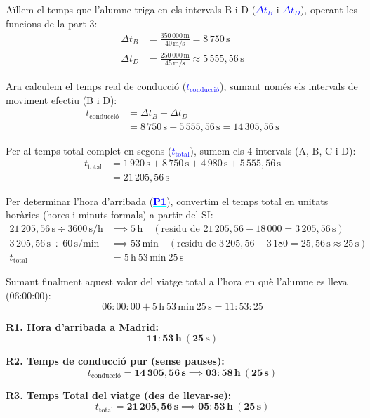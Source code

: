 \documentclass[12pt,a4paper]{article}
\begin{document}
{\color{blue}
Aïllem el temps que l'alumne triga en els intervals B i D (\textcolor{cyan}{\underline{\textcolor{blue}{\textbf{$\Delta t_B$}}}} i \textcolor{cyan}{\underline{\textcolor{blue}{\textbf{$\Delta t_D$}}}}), operant les funcions de la part 3:
\begin{align*}
\Delta t_B &= \frac{350\,000\,\text{m}}{40\,\text{m/s}} = 8\,750\,\text{s} \\[6pt]
\Delta t_D &= \frac{250\,000\,\text{m}}{45\,\text{m/s}} \approx 5\,555{,}56\,\text{s}
\end{align*}

Ara calculem el temps real de conducció (\textcolor{cyan}{\underline{\textcolor{blue}{\textbf{$t_{\text{conducció}}$}}}}), sumant només els intervals de moviment efectiu (B i D):
\begin{align*}
t_{\text{conducció}} &= \Delta t_B + \Delta t_D \\
              &= 8\,750\,\text{s} + 5\,555{,}56\,\text{s} = 14\,305{,}56\,\text{s}
\end{align*}

Per al temps total complet en segons (\textcolor{cyan}{\underline{\textcolor{blue}{\textbf{$t_{\text{total}}$}}}}), sumem els 4 intervals (A, B, C i D):
\begin{align*}
t_{\text{total}} &= 1\,920\,\text{s} + 8\,750\,\text{s} + 4\,980\,\text{s} + 5\,555{,}56\,\text{s} \\
          &= 21\,205{,}56\,\text{s}
\end{align*}

Per determinar l'hora d'arribada (\textcolor{cyan}{\underline{\textcolor{blue}{\textbf{P1}}}}), convertim el temps total en unitats horàries (hores i minuts formals) a partir del SI:
\begin{align*}
21\,205{,}56\,\text{s} \div 3600\,\text{s/h} &\implies 5\,\text{h} \quad (\text{residu de } 21\,205{,}56 - 18\,000 = 3\,205{,}56\,\text{s}) \\
3\,205{,}56\,\text{s} \div 60\,\text{s/min}    &\implies 53\,\text{min} \quad (\text{residu de } 3\,205{,}56 - 3\,180 = 25{,}56\,\text{s} \approx 25\,\text{s}) \\
t_{\text{total}} &= 5\,\text{h}\ 53\,\text{min}\ 25\,\text{s}
\end{align*}

Sumant finalment aquest valor del viatge total a l'hora en què l'alumne es lleva (06:00:00):
\[ 06{:}00{:}00 + 5\,\text{h}\ 53\,\text{min}\ 25\,\text{s} = 11{:}53{:}25 \]

\begin{tcolorbox}[title=Respostes Finals (SI i format horari),colframe=red!70!black,colback=red!5,sharp corners=south,fontupper=\color{blue}]
\textbf{R1. Hora d'arribada a Madrid:}
\[ \mathbf{11{:}53\,\text{h}\ (25\,\text{s})} \]

\textbf{R2. Temps de conducció pur (sense pauses):}
\[ t_{\text{conducció}} = \mathbf{14\,305{,}56\,\text{s}} \implies \mathbf{03{:}58\,\text{h}\ (25\,\text{s})} \]

\textbf{R3. Temps Total del viatge (des de llevar-se):}
\[ t_{\text{total}} = \mathbf{21\,205{,}56\,\text{s}} \implies \mathbf{05{:}53\,\text{h}\ (25\,\text{s})} \]
\end{tcolorbox}
}
\end{document}
